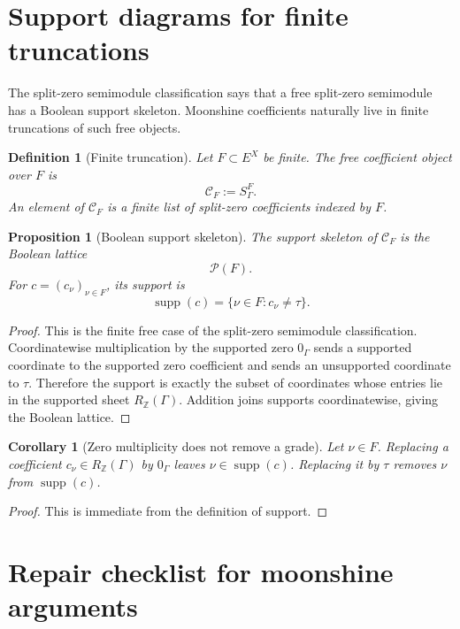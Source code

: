 \documentclass[11pt]{article}
\newtheorem{proposition}[theorem]{Proposition}
\newtheorem{corollary}[theorem]{Corollary}
\newtheorem{definition}[theorem]{Definition}
\newcommand{\ZZ}{\mathbb Z}
\newcommand{\supp}{\operatorname{supp}}
\begin{document}
\section{Support diagrams for finite truncations}

The split-zero semimodule classification says that a free split-zero semimodule has a Boolean support skeleton.  Moonshine coefficients naturally live in finite truncations of such free objects.

\begin{definition}[Finite truncation]
Let \(F\subset E^X\) be finite.  The free coefficient object over \(F\) is
\[
\mathcal C_F:=S_\Gamma^F.
\]
An element of \(\mathcal C_F\) is a finite list of split-zero coefficients indexed by \(F\).
\end{definition}

\begin{proposition}[Boolean support skeleton]
The support skeleton of \(\mathcal C_F\) is the Boolean lattice
\[
\mathcal P(F).
\]
For \(c=(c_\nu)_{\nu\in F}\), its support is
\[
\supp(c)=\{\nu\in F:c_\nu\ne\tau\}.
\]
\end{proposition}

\begin{proof}
This is the finite free case of the split-zero semimodule classification.  Coordinatewise multiplication by the supported zero \(0_\Gamma\) sends a supported coordinate to the supported zero coefficient and sends an unsupported coordinate to \(\tau\).  Therefore the support is exactly the subset of coordinates whose entries lie in the supported sheet \(R_\ZZ(\Gamma)\).  Addition joins supports coordinatewise, giving the Boolean lattice.
\end{proof}

\begin{corollary}[Zero multiplicity does not remove a grade]
Let \(\nu\in F\).  Replacing a coefficient \(c_\nu\in R_\ZZ(\Gamma)\) by \(0_\Gamma\) leaves \(\nu\in\supp(c)\).  Replacing it by \(\tau\) removes \(\nu\) from \(\supp(c)\).
\end{corollary}

\begin{proof}
This is immediate from the definition of support.
\end{proof}

\section{Repair checklist for moonshine arguments}
\end{document}
